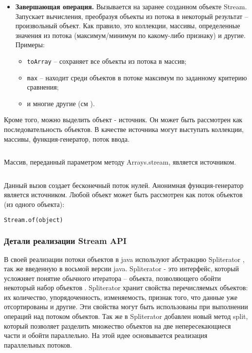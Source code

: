 \begin{itemize}
\begin{itemize}
	\end{itemize}
	\item \textbf{Завершающая операция.} Вызывается на заранее созданном объекте Stream. Запускает вычисления, преобразуя объекты из потока в некоторый результат -- произвольный объект. Как правило, это коллекции, массивы, определенные значения из потока (максимум/минимум по какому-либо признаку) и другие. Примеры:
	\begin{itemize}
		\item \texttt{toArray} -- сохраняет все объекты из потока в массив;
		\item \texttt{max} -- находит среди объектов в потоке максимум по заданному критерию сравнения;
		\item и многие другие (см \cite{java:stream}).
	\end{itemize}
\end{itemize}

Кроме того, можно выделить объект - источник. Он может быть рассмотрен как последовательность объектов. В качестве источника могут выступать коллекции, массивы, функция-генератор, поток ввода.
\inputminted{java}{chapter1/code/IntStream.java}
Массив, переданный параметром методу Arrays.stream, является источником.
\inputminted{java}{chapter1/code/ZerosStream.java}
Данный вызов создает бесконечный поток нулей. Анонимная функция-генератор является источником.
Любой объект может быть рассмотрен как поток объектов (из одного объекта):

\texttt{Stream.of(object)}

\subsubsection{Детали реализации Stream API}\label{streams-desing}
В своей реализации потоки объектов в java используют абстракцию Spliterator 
\cite{java:spliterator}, так же введенную в восьмой версии java. Spliterator - это интерфейс, 
который усложняет понятие обычного итератора -- объекта, позволяющего обойти 
некоторый набор объектов \cite{java:iterator}. Spliterator хранит свойства перечисляемых объектов: их количество, упорядоченность, изменяемость, признак того, что данные уже 
отсортированы и другие. Эти свойства могут быть использованы при выполнении операций над 
потоком объектов. Так же в Spliterator добавлен новый метод split, который позволяет 
разделить множество объектов на две непересекающиеся части и обойти параллельно. На этой идее основывается реализация параллельных потоков.

